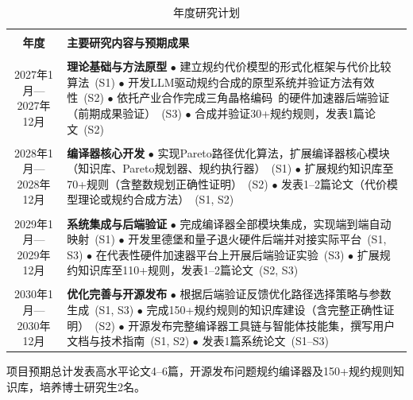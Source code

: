 \begin{table}[htbp]
	\MSzh\MSen\selectfont
	\centering
	\caption{年度研究计划}
	\label{tab:timeline}
	\begin{tabular}{|c|p{12cm}|}
		\hline
		& \\[-6pt]
		\textbf{年度} & \textbf{主要研究内容与预期成果} \\
		\hline
		& \\[-6pt]
		2027年1月—2027年12月 &
		\textbf{理论基础与方法原型} \newline
		$\bullet$ 建立规约代价模型的形式化框架与代价比较算法~(S1) \newline
		$\bullet$ 开发LLM驱动规约合成的原型系统并验证方法有效性~(S2) \newline
		$\bullet$ 依托产业合作完成三角晶格编码~\cite{Pan2025Triangular}的硬件加速器后端验证（前期成果验证）~(S3) \newline
		$\bullet$ 合成并验证30+规约规则，发表1篇论文~(S2) \\
		\hline
		& \\[-6pt]
		2028年1月—2028年12月 &
		\textbf{编译器核心开发} \newline
		$\bullet$ 实现Pareto路径优化算法，扩展编译器核心模块（知识库、Pareto规划器、规约执行器）~(S1) \newline
		$\bullet$ 扩展规约知识库至70+规则（含整数规划正确性证明）~(S2) \newline
		$\bullet$ 发表1--2篇论文（代价模型理论或规约合成方法）~(S1, S2) \\
		\hline
		& \\[-6pt]
		2029年1月—2029年12月 &
		\textbf{系统集成与后端验证} \newline
		$\bullet$ 完成编译器全部模块集成，实现端到端自动映射~(S1) \newline
		$\bullet$ 开发里德堡和量子退火硬件后端并对接实际平台~(S1, S3) \newline
		$\bullet$ 在代表性硬件加速器平台上开展后端验证实验~(S3) \newline
		$\bullet$ 扩展规约知识库至110+规则，发表1--2篇论文~(S2, S3) \\
		\hline
		& \\[-6pt]
		2030年1月—2030年12月 &
		\textbf{优化完善与开源发布} \newline
		$\bullet$ 根据后端验证反馈优化路径选择策略与参数生成~(S1, S3) \newline
		$\bullet$ 完成150+规约规则的知识库建设（含完整正确性证明）~(S2) \newline
		$\bullet$ 开源发布完整编译器工具链与智能体技能集，撰写用户文档与技术指南~(S1, S2) \newline
		$\bullet$ 发表1篇系统论文~(S1--S3) \\
		\hline
	\end{tabular}
\end{table}

项目预期总计发表高水平论文4--6篇，开源发布问题规约编译器及150+规约规则知识库，培养博士研究生2名。

\newpage
